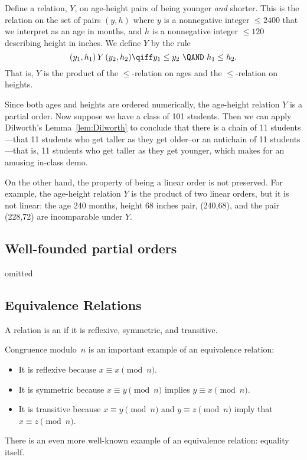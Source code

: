 \begin{example}\label{Y}
Define a relation, $Y$, on age-height pairs of being younger \emph{and}
shorter.  This is the relation on the set of pairs $(y,h)$ where $y$ is a
nonnegative integer $\le 2400$ that we interpret as an age in months, and $h$
is a nonnegative integer $\le 120$ describing height in inches.  We define $Y$
by the rule
\[
(y_1,h_1)\, Y\, (y_2,h_2) \qiff y_1 \le y_2\ \QAND\ h_1 \le h_2.
\]
That is, $Y$ is the product of the $\le$-relation on ages and the
$\le$-relation on heights.

Since both ages and heights are ordered numerically, the age-height
relation $Y$ is a partial order.  Now suppose we have a class of 101
students.  Then we can apply Dilworth's Lemma~\ref{lem:Dilworth} to
conclude that there is a chain of 11 students---that 11 students who
get taller as they get older--or an antichain of 11 students---that
is, 11 students who get taller as they get younger, which makes for an
amusing in-class demo.
\end{example}

On the other hand, the property of being a linear order is not preserved.
For example, the age-height relation $Y$ is the product of two linear
orders, but it is not linear: the age 240 months, height 68 inches pair,
(240,68), and the pair (228,72) are incomparable under $Y$.

\begin{problems}

\classproblems
{}

\end{problems}

\begin{editingnotes}
\chapter*{Well-founded partial orders}
omitted
\end{editingnotes}

\section{Equivalence Relations}\label{equiv_rel_sec}
\begin{definition}
A relation is an  if it is reflexive,
symmetric, and transitive.
\end{definition}

Congruence modulo~$n$ is an important example of an equivalence
relation:
\begin{itemize}

\item
It is reflexive because $x \equiv x \pmod{n}$.

\item
It is symmetric because $x \equiv y \pmod{n}$ implies $y \equiv x
\pmod{n}$.

\item
It is transitive because $x \equiv y \pmod{n}$ and $y \equiv z
\pmod{n}$ imply that $x \equiv z \pmod{n}$.

\end{itemize}
There is an even more well-known example of an equivalence relation:
equality itself.


